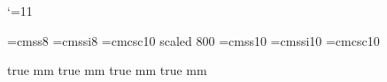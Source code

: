 

\catcode`\@=11

\font\norm=cmss8
\font\intfont=cmssi8
\font\titfont@page=cmcsc10 scaled 800
\font\titfont=cmss10
\font\titintfont=cmssi10
\font\cassfont=cmcsc10

\newdimen\colwidth  {} true mm
\newdimen\backheight {} true mm
\newdimen\titheight {} true mm
\newdimen\pagheight {} true mm

\def\@seite#1{%
    \global\setbox\@page=\vbox{\hsize=\colwidth
        \everypar={\global\hangindent=1em }%
        \vskip \tw@\p@
        #1\endgraf
        \vfil
        }%
    }

\def\cnt#1:{[#1]}
\def\von#1:{{\intfont #1\/}:\penalty -100 } %
\def\nl{\hfill\break}

\def\@titel#1{%
    \global\setbox\@title=\vbox{\hsize=\colwidth
        \let\intfont=\titintfont        %
        \vfill
        \unvbox\@title
        \titfont #1\endgraf
        \vfill
        }%
    {\titfont@page
        \def\von##1:{\uppercase{##1}:\penalty -100 }%
        #1%
    }}


\newbox\@seitea
\newbox\@seiteb
\newbox\@titela
\newbox\@titelb
\def\seitea{\let\@page=\@seitea \let\titel=\titela \obeylines \@seite}
\def\seiteb{\let\@page=\@seiteb \let\titel=\titelb \obeylines \@seite}
\def\titela{\let\@title=\@titela \@titel}
\def\titelb{\let\@title=\@titelb \@titel}

\def\titelcass#1{%
    \global\setbox\@titela=\vbox{\hsize=\colwidth
        \vfill
        \unvbox\@titela
        \titfont #1\endgraf
        \vfill
        }%
    }




\def\begincassette#1{%
     \def\cassname{#1}%
     \setbox\@seitea\vbox{\hrule width\colwidth height\z@ depth\z@ \vfil}%
     \setbox\@seiteb\vbox{\hrule width\colwidth height\z@ depth\z@ \vfil}%
     \setbox\@titela\vbox{\hrule width\colwidth height\z@ depth\z@ \vfil}%
     \setbox\@titelb\vbox{\hrule width\colwidth height\z@ depth\z@ \vfil}%
     \splittopskip\baselineskip
     }


